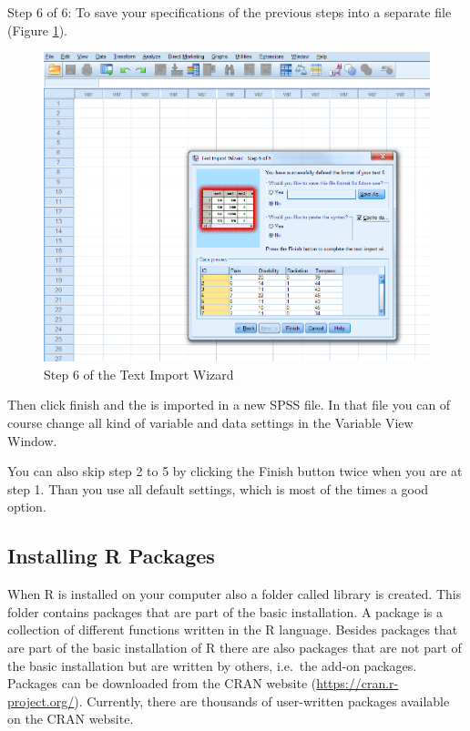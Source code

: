 \documentclass[]{book}
\begin{document}
Step 6 of 6: To save your specifications of the previous steps into a
separate file (Figure \ref{fig:fig24}).

\begin{figure}

{\centering \includegraphics[width=0.95\linewidth]{images/fig1.24} 

}

\caption{Step 6 of the Text Import Wizard}\label{fig:fig24}
\end{figure}

Then click finish and the is imported in a new SPSS file. In that file
you can of course change all kind of variable and data settings in the
Variable View Window.

You can also skip step 2 to 5 by clicking the Finish button twice when
you are at step 1. Than you use all default settings, which is most of
the times a good option.

\subsection{Installing R Packages}\label{installing-r-packages}

When R is installed on your computer also a folder called library is
created. This folder contains packages that are part of the basic
installation. A package is a collection of different functions written
in the R language. Besides packages that are part of the basic
installation of R there are also packages that are not part of the basic
installation but are written by others, i.e.~the add-on packages.
Packages can be downloaded from the CRAN website
(\url{https://cran.r-project.org/}). Currently, there are thousands of
user-written packages available on the CRAN website.
\end{document}

